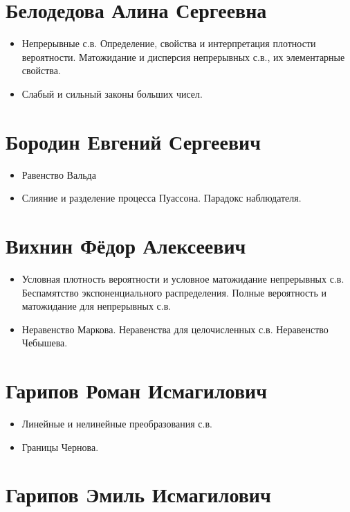 \documentclass[12pt]{article}
\begin{document}

\section{Белодедова Алина Сергеевна}

\begin{itemize}
  \item Непрерывные с.в. Определение, свойства и интерпретация плотности вероятности. Матожидание и дисперсия непрерывных с.в., их элементарные свойства.
  \item Слабый и сильный законы больших чисел.
\end{itemize}

\section{Бородин Евгений Сергеевич}

\begin{itemize}
  \item Равенство Вальда
  \item Слияние и разделение процесса Пуассона. Парадокс наблюдателя.
\end{itemize}

\section{Вихнин Фёдор Алексеевич}

\begin{itemize}
  \item Условная плотность вероятности и условное матожидание непрерывных с.в. Беспамятство экспоненциального распределения. Полные вероятность и матожидание для непрерывных с.в.
  \item Неравенство Маркова. Неравенства для целочисленных с.в. Неравенство Чебышева.
\end{itemize}

\section{Гарипов Роман Исмагилович}

\begin{itemize}
  \item Линейные и нелинейные преобразования с.в.
  \item Границы Чернова. 
\end{itemize}

\section{Гарипов Эмиль Исмагилович}
\end{document}

